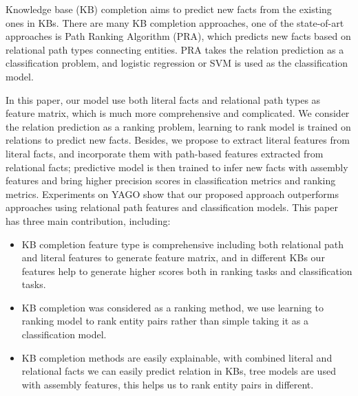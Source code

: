 
\begin{eabstract}
Knowledge base (KB) completion aims to predict new facts
from the existing ones in KBs. There are many KB completion approaches,
one of the state-of-art approaches is Path Ranking Algorithm
(PRA), which predicts new facts based on relational path types connecting entities.
PRA takes the relation prediction as a classification problem, and
logistic regression or SVM is used as the classification model. 

In this paper, our model
use both literal facts and relational path types as feature matrix, which is much more comprehensive and complicated. We
consider the relation prediction as a ranking problem, learning to rank
model is trained on relations to predict new facts. Besides, we propose to extract literal features from literal facts, and incorporate them with path-based
features extracted from relational facts; predictive
model is then trained to infer new
facts with assembly features and bring higher precision scores in classification metrics and ranking metrics. Experiments on YAGO show that our proposed approach outperforms approaches using relational path features and classification models.
This paper has three main contribution, including:
\begin{itemize}[$\bullet$]
    \item KB completion feature type is comprehensive including both relational path and literal features to generate feature matrix, and in different KBs our features help to generate higher scores both in ranking tasks and classification tasks.
    \item KB completion was considered as a ranking method, we use learning to ranking model to rank entity pairs rather than simple taking it as a classification model.
    \item KB completion methods are easily explainable, with combined literal and relational facts we can easily predict relation in KBs, tree models are used with assembly features, this helps us to rank entity pairs in different.
  \end{itemize}

\end{eabstract}

